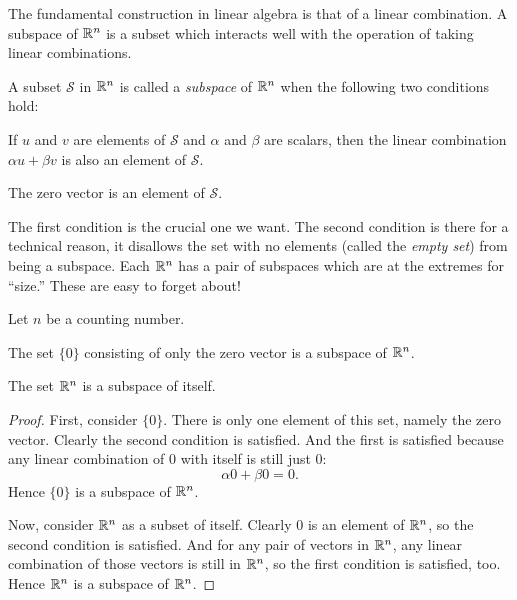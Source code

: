 \documentclass[elementsmain.tex]{subfiles}
\begin{document}
The fundamental construction in linear algebra is that of a linear combination. A subspace of $\mathbb{R}^n$ is a subset which interacts well with the operation of taking linear combinations.

\begin{definition}[Subspace] A subset $\mathcal{S}$ in $\mathbb{R}^n$ is called a \emph{subspace} of $\mathbb{R}^n$ when the following two conditions hold:
\begin{compactenum}
\item If $u$ and $v$ are elements of $\mathcal{S}$ and $\alpha$ and $\beta$ are scalars, then the linear combination $\alpha u + \beta v$ is also an element of $\mathcal{S}$.
\item The zero vector is an element of $\mathcal{S}$.
\end{compactenum}
\end{definition}

The first condition is the crucial one we want. The second condition is there for a technical reason, it disallows the set with no elements (called the \emph{empty set}) from being a subspace. Each $\mathbb{R}^n$ has a pair of subspaces which are at the extremes for ``size.'' These are easy to forget about! 



\begin{theorem} Let $n$ be a counting number. 
\begin{compactitem}
\item The set $\{0\}$ consisting of only the zero vector is a subspace of $\mathbb{R}^n$.
\item The set $\mathbb{R}^n$ is a subspace of itself.
\end{compactitem}
\end{theorem}

\begin{proof}
First, consider $\{0\}$. There is only one element of this set, namely the zero vector. Clearly the second condition is satisfied. And the first is satisfied because any linear combination of $0$ with itself is still just $0$:
\[
\alpha 0 + \beta 0 = 0.
\]
Hence $\{0\}$ is a subspace of $\mathbb{R}^n$.

Now, consider $\mathbb{R}^n$ as a subset of itself. Clearly $0$ is an element of $\mathbb{R}^n$, so the second condition is satisfied. And for any pair of vectors in $\mathbb{R}^n$, any linear combination of those vectors is still in $\mathbb{R}^n$, so the first condition is satisfied, too. Hence $\mathbb{R}^n$ is a subspace of $\mathbb{R}^n$.
\end{proof}
\end{document}

